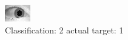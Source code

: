 \begin{figure}[h!]
\begin{center}
\includegraphics[width=0.60\columnwidth]{figures/ID1557_class_2_target_1.png}
\end{center}
\caption{ Classification: 2 actual target: 1}
\label{fig:ID1557_class_2_target_1}
\end{figure}
